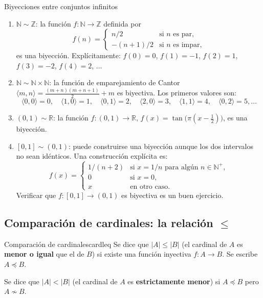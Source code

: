 \begin{ejemplo}{Biyecciones entre conjuntos infinitos}{}
\begin{enumerate}[leftmargin=2em, label=(\alph*)]
  \item $\mathbb{N} \sim \mathbb{Z}$: la función $f: \mathbb{N} \to \mathbb{Z}$ definida por
  \[
    f(n) = \begin{cases} n/2 & \text{si } n \text{ es par}, \\ -(n+1)/2 & \text{si } n \text{ es impar}, \end{cases}
  \]
  es una biyección. Explícitamente: $f(0) = 0$, $f(1) = -1$, $f(2) = 1$, $f(3) = -2$, $f(4) = 2$, $\ldots$

  \item $\mathbb{N} \sim \mathbb{N} \times \mathbb{N}$: la función de emparejamiento de Cantor $\langle m, n \rangle = \frac{(m+n)(m+n+1)}{2} + m$ es biyectiva. Los primeros valores son:
  \[
    \langle 0,0\rangle = 0,\quad \langle 1,0\rangle = 1,\quad \langle 0,1\rangle = 2,\quad \langle 2,0\rangle = 3,\quad \langle 1,1\rangle = 4,\quad \langle 0,2\rangle = 5,\ldots
  \]

  \item $(0,1) \sim \mathbb{R}$: la función $f: (0,1) \to \mathbb{R}$, $f(x) = \tan\!\bigl(\pi(x - \tfrac{1}{2})\bigr)$, es una biyección.

  \item $[0,1] \sim (0,1)$: puede construirse una biyección aunque los dos intervalos no sean idénticos. Una construcción explícita es:
  \[
    f(x) = \begin{cases}
      1/(n+2) & \text{si } x = 1/n \text{ para algún } n \in \mathbb{N}^+, \\
      0 & \text{si } x = 0, \\
      x & \text{en otro caso.}
    \end{cases}
  \]
  Verificar que $f: [0,1] \to (0,1)$ es biyectiva es un buen ejercicio.
\end{enumerate}
\end{ejemplo}

\subsection{Comparación de cardinales: la relación $\leq$}

\begin{definicion}{Comparación de cardinales}{cardleq}
Se dice que $|A| \leq |B|$ (el cardinal de $A$ es \textbf{menor o igual} que el de $B$) si existe una función inyectiva $f: A \to B$. Se escribe $A \preceq B$.

Se dice que $|A| < |B|$ (el cardinal de $A$ es \textbf{estrictamente menor}) si $A \preceq B$ pero $A \not\sim B$.
\end{definicion}

